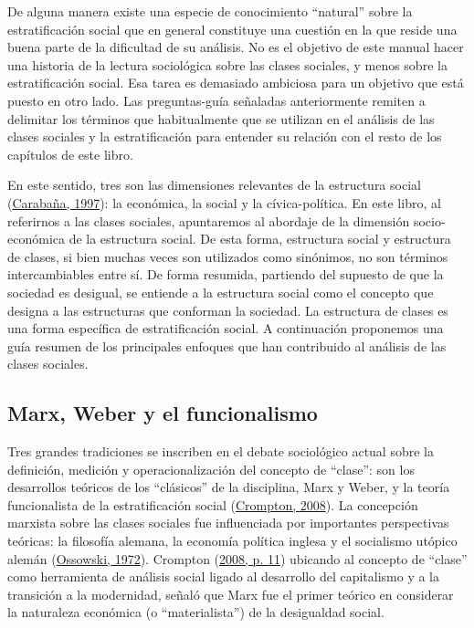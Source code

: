\documentclass[
]{article}
\begin{document}
De alguna manera existe una especie de conocimiento ``natural'' sobre la estratificación social que en general constituye una cuestión en la que reside una buena parte de la dificultad de su análisis. No es el objetivo de este manual hacer una historia de la lectura sociológica sobre las clases sociales, y menos sobre la estratificación social. Esa tarea es demasiado ambiciosa para un objetivo que está puesto en otro lado. Las preguntas-guía señaladas anteriormente remiten a delimitar los términos que habitualmente que se utilizan en el análisis de las clases sociales y la estratificación para entender su relación con el resto de los capítulos de este libro.

En este sentido, tres son las dimensiones relevantes de la estructura social (\protect\hyperlink{ref-Carabana1997}{Carabaña, 1997}): la económica, la social y la cívica-política. En este libro, al referirnos a las clases sociales, apuntaremos al abordaje de la dimensión socio-económica de la estructura social. De esta forma, estructura social y estructura de clases, si bien muchas veces son utilizados como sinónimos, no son términos intercambiables entre sí. De forma resumida, partiendo del supuesto de que la sociedad es desigual, se entiende a la estructura social como el concepto que designa a las estructuras que conforman la sociedad. La estructura de clases es una forma específica de estratificación social. A continuación proponemos una guía resumen de los principales enfoques que han contribuido al análisis de las clases sociales.

\hypertarget{marx}{%
\subsection{Marx, Weber y el funcionalismo}\label{marx}}

Tres grandes tradiciones se inscriben en el debate sociológico actual sobre la definición, medición y operacionalización del concepto de ``clase'': son los desarrollos teóricos de los ``clásicos'' de la disciplina, Marx y Weber, y la teoría funcionalista de la estratificación social (\protect\hyperlink{ref-Crompton2008}{Crompton, 2008}). La concepción marxista sobre las clases sociales fue influenciada por importantes perspectivas teóricas: la filosofía alemana, la economía política inglesa y el socialismo utópico alemán (\protect\hyperlink{ref-Ossowski1972}{Ossowski, 1972}). Crompton (\protect\hyperlink{ref-Crompton2008}{2008, p. 11}) ubicando al concepto de ``clase'' como herramienta de análisis social ligado al desarrollo del capitalismo y a la transición a la modernidad, señaló que Marx fue el primer teórico en considerar la naturaleza económica (o ``materialista'') de la desigualdad social.
\end{document}
